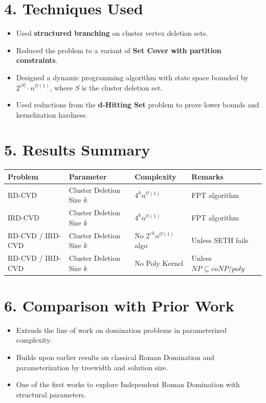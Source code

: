 \documentclass{article}
\begin{document}
\section*{4. Techniques Used}
\begin{itemize}[leftmargin=1.5em]
    \item Used \textbf{structured branching} on cluster vertex deletion sets.
    \item Reduced the problem to a variant of \textbf{Set Cover with partition constraints}.
    \item Designed a dynamic programming algorithm with state space bounded by \( 2^{|S|} \cdot n^{\mathcal{O}(1)} \), where \( S \) is the cluster deletion set.
    \item Used reductions from the \textbf{d-Hitting Set} problem to prove lower bounds and kernelization hardness.
\end{itemize}

\section*{5. Results Summary}
\begin{tabular}{|l|l|l|l|}
\hline
\textbf{Problem} & \textbf{Parameter} & \textbf{Complexity} & \textbf{Remarks} \\
\hline
RD-CVD & Cluster Deletion Size \( k \) & \( 4^k n^{\mathcal{O}(1)} \) & FPT algorithm \\
IRD-CVD & Cluster Deletion Size \( k \) & \( 4^k n^{\mathcal{O}(1)} \) & FPT algorithm \\
RD-CVD / IRD-CVD & Cluster Deletion Size \( k \) & No \( 2^{\varepsilon k} n^{\mathcal{O}(1)} \) algo & Unless SETH fails \\
RD-CVD / IRD-CVD & Cluster Deletion Size \( k \) & No Poly Kernel & Unless $NP \subseteq coNP/poly$ \\
\hline
\end{tabular}

\section*{6. Comparison with Prior Work}
\begin{itemize}[leftmargin=1.5em]
    \item Extends the line of work on domination problems in parameterized complexity.
    \item Builds upon earlier results on classical Roman Domination and parameterization by treewidth and solution size.
    \item One of the first works to explore Independent Roman Domination with structural parameters.
\end{itemize}
\end{document}

